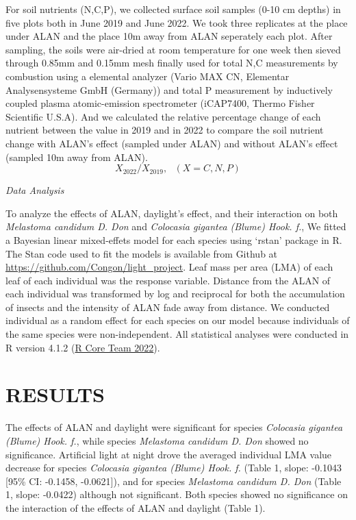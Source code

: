 \documentclass[
]{article}
\begin{document}
For soil nutrients (N,C,P), we collected surface soil samples (0-10 cm
depths) in five plots both in June 2019 and June 2022. We took three
replicates at the place under ALAN and the place 10m away from ALAN
seperately each plot. After sampling, the soils were air-dried at room
temperature for one week then sieved through 0.85mm and 0.15mm mesh
finally used for total N,C measurements by combustion using a elemental
analyzer (Vario MAX CN, Elementar Analysensysteme GmbH (Germany)) and
total P measurement by inductively coupled plasma atomic-emission
spectrometer (iCAP7400, Thermo Fisher Scientific U.S.A). And we
calculated the relative percentage change of each nutrient between the
value in 2019 and in 2022 to compare the soil nutrient change with
ALAN's effect (sampled under ALAN) and without ALAN's effect (sampled
10m away from ALAN).\\
\[
X_{2022}/X_{2019}, \ \ \ (X = C,N,P) 
\]

\emph{Data Analysis}

To analyze the effects of ALAN, daylight's effect, and their interaction
on both \emph{Melastoma candidum D. Don} and \emph{Colocasia gigantea
(Blume) Hook. f.}, We fitted a Bayesian linear mixed-effets model for
each species using `rstan' package in R. The Stan code used to fit the
models is available from Github at
\url{https://github.com/Congon/light_project}. Leaf mass per area (LMA)
of each leaf of each individual was the response variable. Distance from
the ALAN of each individual was transformed by log and reciprocal for
both the accumulation of insects and the intensity of ALAN fade away
from distance. We conducted individual as a random effect for each
species on our model because individuals of the same species were
non-independent. All statistical analyses were conducted in R version
4.1.2 (\protect\hyperlink{ref-RCoreTeam2022}{R Core Team 2022}).

\hypertarget{results}{%
\section{RESULTS}\label{results}}

The effects of ALAN and daylight were significant for species
\emph{Colocasia gigantea (Blume) Hook. f.}, while species
\emph{Melastoma candidum D. Don} showed no significance. Artificial
light at night drove the averaged individual LMA value decrease for
species \emph{Colocasia gigantea (Blume) Hook. f.} (Table 1, slope:
-0.1043 {[}95\% CI: -0.1458, -0.0621{]}), and for species
\emph{Melastoma candidum D. Don} (Table 1, slope: -0.0422) although not
significant. Both species showed no significance on the interaction of
the effects of ALAN and daylight (Table 1).
\end{document}
